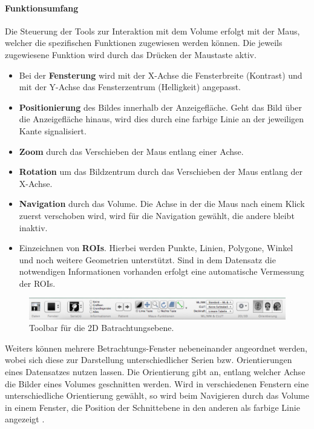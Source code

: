 \paragraph{Funktionsumfang}
Die Steuerung der Tools zur Interaktion mit dem Volume erfolgt mit der Maus, 
welcher die spezifischen Funktionen zugewiesen werden können. Die jeweils zugewiesene Funktion wird durch das Drücken der Maustaste aktiv.
\begin{itemize}
	\item Bei der \textbf{Fensterung} wird mit der X-Achse die Fensterbreite (Kontrast) und mit der Y-Achse das Fensterzentrum (Helligkeit) angepasst.
	\item \textbf{Positionierung} des Bildes innerhalb der Anzeigefläche. Geht das Bild über die Anzeigefläche hinaus, wird dies durch eine farbige Linie an der jeweiligen Kante signalisiert.
	\item \textbf{Zoom} durch das Verschieben der Maus entlang einer Achse.
	\item \textbf{Rotation} um das Bildzentrum durch das Verschieben  der Maus entlang der X-Achse.
	\item \textbf{Navigation} durch das Volume. Die Achse in der die Maus nach einem Klick zuerst verschoben wird, wird für die Navigation gewählt, die andere bleibt inaktiv.
	\item Einzeichnen von \textbf{ROIs}. Hierbei werden Punkte, Linien, Polygone, Winkel und noch weitere Geometrien unterstützt. 
		Sind in dem Datensatz die notwendigen Informationen vorhanden erfolgt eine automatische Vermessung der ROIs.
\end{itemize}
\begin{figure}[t]
	\centering
	\includegraphics[width=0.8\linewidth]{img/c2_osirix_2d_view_toolbar.jpg}
	\caption{Toolbar für die 2D Batrachtungsebene.}
	\label{fig:osiri_2dView_toolbar}
\end{figure}
Weiters können mehrere Betrachtungs-Fenster nebeneinander angeordnet werden, wobei sich diese zur Darstellung unterschiedlicher Serien bzw. Orientierungen eines Datensatzes nutzen lassen. 
Die Orientierung gibt an, 
entlang welcher Achse die Bilder eines Volumes geschnitten werden.
Wird in verschiedenen Fenstern eine unterschiedliche Orientierung gewählt,
so wird beim Navigieren durch das Volume in einem Fenster, 
die Position der Schnittebene in den anderen als farbige Linie angezeigt \cite{osirix}.

